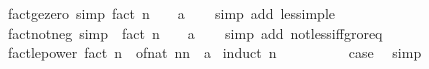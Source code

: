 \begin{isabellebody}
\isanewline
{}\isamarkupfalse%
\ fact{\isacharunderscore}{\kern0pt}ge{\isacharunderscore}{\kern0pt}zero\ {\isacharbrackleft}{\kern0pt}simp{\isacharbrackright}{\kern0pt}{\isacharcolon}{\kern0pt}\ {\isachardoublequoteopen}fact\ n\ {\isasymge}\ {\isacharparenleft}{\kern0pt}{}\ {\isacharcolon}{\kern0pt}{\isacharcolon}{\kern0pt}\ {\isacharprime}{\kern0pt}a{\isacharparenright}{\kern0pt}{\isachardoublequoteclose}\isanewline
%
\isadelimproof
\ \ %
\endisadelimproof
%
\isatagproof
{}\isamarkupfalse%
\ {\isacharparenleft}{\kern0pt}simp\ add{\isacharcolon}{\kern0pt}\ less{\isacharunderscore}{\kern0pt}imp{\isacharunderscore}{\kern0pt}le{\isacharparenright}{\kern0pt}%
\endisatagproof
{\isafoldproof}%
%
\isadelimproof
\isanewline
%
\endisadelimproof
\isanewline
{}\isamarkupfalse%
\ fact{\isacharunderscore}{\kern0pt}not{\isacharunderscore}{\kern0pt}neg\ {\isacharbrackleft}{\kern0pt}simp{\isacharbrackright}{\kern0pt}{\isacharcolon}{\kern0pt}\ {\isachardoublequoteopen}{\isasymnot}\ fact\ n\ {\isacharless}{\kern0pt}\ {\isacharparenleft}{\kern0pt}{}\ {\isacharcolon}{\kern0pt}{\isacharcolon}{\kern0pt}\ {\isacharprime}{\kern0pt}a{\isacharparenright}{\kern0pt}{\isachardoublequoteclose}\isanewline
%
\isadelimproof
\ \ %
\endisadelimproof
%
\isatagproof
{}\isamarkupfalse%
\ {\isacharparenleft}{\kern0pt}simp\ add{\isacharcolon}{\kern0pt}\ not{\isacharunderscore}{\kern0pt}less{\isacharunderscore}{\kern0pt}iff{\isacharunderscore}{\kern0pt}gr{\isacharunderscore}{\kern0pt}or{\isacharunderscore}{\kern0pt}eq{\isacharparenright}{\kern0pt}%
\endisatagproof
{\isafoldproof}%
%
\isadelimproof
\isanewline
%
\endisadelimproof
\isanewline
{}\isamarkupfalse%
\ fact{\isacharunderscore}{\kern0pt}le{\isacharunderscore}{\kern0pt}power{\isacharcolon}{\kern0pt}\ {\isachardoublequoteopen}fact\ n\ {\isasymle}\ {\isacharparenleft}{\kern0pt}of{\isacharunderscore}{\kern0pt}nat\ {\isacharparenleft}{\kern0pt}n{\isacharcircum}{\kern0pt}n{\isacharparenright}{\kern0pt}\ {\isacharcolon}{\kern0pt}{\isacharcolon}{\kern0pt}\ {\isacharprime}{\kern0pt}a{\isacharparenright}{\kern0pt}{\isachardoublequoteclose}\isanewline
%
\isadelimproof
%
\endisadelimproof
%
\isatagproof
{}\isamarkupfalse%
\ {\isacharparenleft}{\kern0pt}induct\ n{\isacharparenright}{\kern0pt}\isanewline
\ \ \isamarkupfalse%
\ {}\isanewline
\ \ \isamarkupfalse%
\ \isamarkupfalse%
\ {\isacharquery}{\kern0pt}case\ \isamarkupfalse%
\ simp\isanewline
{}\isamarkupfalse%

\end{isabellebody}
